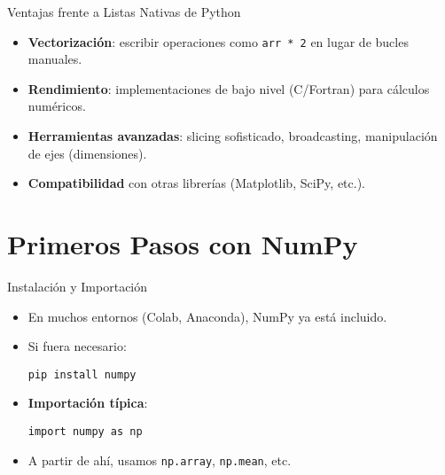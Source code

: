 \documentclass[10pt]{beamer}
\begin{document}
\begin{frame}{Ventajas frente a Listas Nativas de Python}
  \begin{itemize}
    \item \textbf{Vectorización}: escribir operaciones como \texttt{arr * 2} en lugar de bucles manuales.
    \item \textbf{Rendimiento}: implementaciones de bajo nivel (C/Fortran) para cálculos numéricos.
    \item \textbf{Herramientas avanzadas}: slicing sofisticado, broadcasting, manipulación de ejes (dimensiones).
    \item \textbf{Compatibilidad} con otras librerías (Matplotlib, SciPy, etc.).
  \end{itemize}
\end{frame}

\section{Primeros Pasos con NumPy}

\begin{frame}[fragile]{Instalación y Importación}
  \begin{itemize}
    \item En muchos entornos (Colab, Anaconda), NumPy ya está incluido.
    \item Si fuera necesario:
\begin{verbatim}
pip install numpy
\end{verbatim}
    \item \textbf{Importación típica}:
\begin{verbatim}
import numpy as np
\end{verbatim}
    \item A partir de ahí, usamos \texttt{np.array}, \texttt{np.mean}, etc.
  \end{itemize}
\end{frame}
\end{document}
